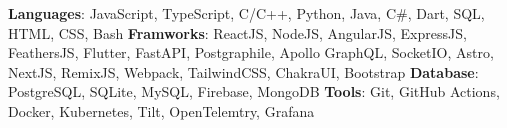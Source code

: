 \textbf{Languages}: JavaScript, TypeScript, C/C++, Python, Java, C\#, Dart, SQL, HTML, CSS, Bash
\textbf{Framworks}: ReactJS, NodeJS, AngularJS, ExpressJS, FeathersJS, Flutter, FastAPI, Postgraphile, Apollo GraphQL, SocketIO, Astro, NextJS, RemixJS, Webpack, TailwindCSS, ChakraUI, Bootstrap
\textbf{Database}: PostgreSQL, SQLite, MySQL, Firebase, MongoDB
\textbf{Tools}: Git, GitHub Actions, Docker, Kubernetes, Tilt, OpenTelemtry, Grafana
